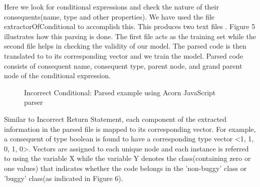 \documentclass[sigconf]{acmart}
\begin{document}
 \newline Here we look for conditional expressions  and check the nature of their consequents(name, type and other properties).  We have used the file extractorOfConditional to accomplish this. This produces two text files . Figure 5 illustrates how this parsing is done. The first file acts as the training set while the second file helps in checking the validity of our model. The parsed code is then translated to to its corresponding vector and we train the model. Parsed code consists of consequent name, consequent type, parent node, and grand parent node of the conditional expression. \newline
\begin{figure}[!htb]
    \centering
    
    \qquad

    \caption{Incorrect Conditional: Parsed example using Acorn JavaScript parser}%
    \label{accuracy_and_loss_incorrect_if_statement}%
\end{figure}
\newline Similar to Incorrect Return Statement, each component of the extracted information in the parsed file is mapped to its corresponding vector. For example, a consequent of type boolean is found to have a corresponding type vector <1, 1, 0, 1, 0>. Vectors are assigned to each unique node and each instance is referred to using the variable X while the variable Y denotes the class(containing zero or one values) that indicates whether the code belongs in the 'non-buggy' class or 'buggy' class(as indicated in Figure 6).
\end{document}
